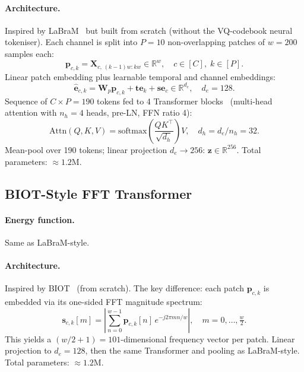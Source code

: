 \documentclass[11pt,a4paper]{article}
\begin{document}
\paragraph{Architecture.}
Inspired by LaBraM~\cite{labram} but built from scratch (without the VQ-codebook
neural tokeniser).  Each channel is split into $P{=}10$ non-overlapping patches of
$w{=}200$ samples each:
\begin{equation}
  \mathbf{p}_{c,k} = \mathbf{X}_{c,\,(k-1)w:kw}\in\mathbb{R}^{w},\quad c\in[C],\;k\in[P].
\end{equation}
Linear patch embedding plus learnable temporal and channel embeddings:
\begin{equation}
  \hat{\mathbf{e}}_{c,k} = \mathbf{W}_p\mathbf{p}_{c,k} + \mathbf{te}_k + \mathbf{se}_c
  \in\mathbb{R}^{d_e},\quad d_e{=}128.
\end{equation}
Sequence of $C \times P = 190$ tokens fed to 4 Transformer blocks~\cite{transformer}
(multi-head attention with $n_h{=}4$ heads, pre-LN, FFN ratio 4):
\begin{equation}
  \mathrm{Attn}(Q,K,V) = \mathrm{softmax}\!\left(\frac{QK^\top}{\sqrt{d_h}}\right)V,
  \quad d_h = d_e / n_h = 32.
\end{equation}
Mean-pool over 190 tokens; linear projection $d_e\to 256$: $\mathbf{z}\in\mathbb{R}^{256}$.
Total parameters: $\approx 1.2$M.

\subsection{BIOT-Style FFT Transformer}
\label{sec:math_biot}

\paragraph{Energy function.} Same as LaBraM-style.

\paragraph{Architecture.}
Inspired by BIOT~\cite{biot} (from scratch).  The key difference: each patch
$\mathbf{p}_{c,k}$ is embedded via its one-sided FFT magnitude spectrum:
\begin{equation}
  \mathbf{s}_{c,k}[m] = \left|\sum_{n=0}^{w-1}\mathbf{p}_{c,k}[n]\,
    e^{-j2\pi mn/w}\right|,\quad m=0,\ldots,\tfrac{w}{2}.
\end{equation}
This yields a $(w/2+1){=}101$-dimensional frequency vector per patch.
Linear projection to $d_e{=}128$, then the same Transformer and pooling as LaBraM-style.
Total parameters: $\approx 1.2$M.
\end{document}
